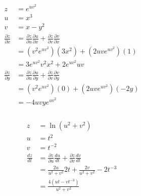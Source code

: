 \documentclass{article}
\begin{document}
\begin{align*}
  z                             & = e^{u v^2}                                                                                                                 \\
  u                             & = x^3                                                                                                                       \\
  v                             & = x - y^2                                                                                                                   \\
  \frac{\partial z}{\partial x} & = \frac{\partial z}{\partial u} \frac{\partial u}{\partial x} + \frac{\partial z}{\partial v} \frac{\partial v}{\partial x} \\
                                & = (v^2 e^{u v^2}) (3 x^2) + (2 u v e^{u v^2}) (1)                                                                           \\
                                & = 3 e^{u v^2} v^2 x^2 + 2 e^{u v^2} u v                                                                                     \\
  \frac{\partial z}{\partial y} & = \frac{\partial z}{\partial u} \frac{\partial u}{\partial y} + \frac{\partial z}{\partial v} \frac{\partial v}{\partial y} \\
                                & = (v^2 e^{u v^2}) (0) + (2 u v e^{u v^2}) (-2 y)                                                                            \\
                                & = -4 u v y e^{u v^2}
\end{align*}

\setcounter{subsubsection}{48}
\subsubsection{}

\begin{align*}
  z               & = \ln (u^2 + v^2)                                                                               \\
  u               & = t^2                                                                                           \\
  v               & = t^{-2}                                                                                        \\
  \frac{d z}{d t} & = \frac{\partial z}{\partial u} \frac{d u}{d t} + \frac{\partial z}{\partial v} \frac{d v}{d t} \\
                  & = \frac{2 u}{u^2 + v^2} 2 t + \frac{2 v}{u^2 + v^2} -2 t^{-3}                                   \\
                  & = \frac{4 (u t - v t^{-3})}{u^2 + v^2}
\end{align*}
\end{document}
